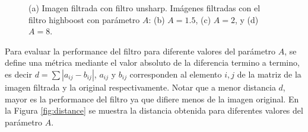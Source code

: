 \documentclass[11pt, twocolumn]{article}
\begin{document}
\begin{figure}[H]
  \centering
  \hfill
  \hfill
  \hfill
  \hfill
  \caption{(a) Imagen filtrada con filtro unsharp. Imágenes filtradas con el filtro highboost con parámetro $A$: (b) $A = 1.5$, (c) $A = 2$, y (d) $A = 8$.}
  \label{fig:figuras_ej_6_filtered}
\end{figure}

Para evaluar la performance del filtro para diferente valores del parámetro $A$, se define una métrica mediante el valor absoluto de la diferencia termino a termino, es decir $d = \sum \left|a_{ij} - b_{ij}\right|$, $a_{ij}$ y $b_{ij}$ corresponden al elemento $i, j$ de la matriz de la imagen filtrada y la original respectivamente. Notar que a menor distancia $d$, mayor es la performance del filtro ya que difiere menos de la imagen original. En la Figura \ref{fig:distance} se muestra la distancia obtenida para diferentes valores del parámetro $A$.
\end{document}

